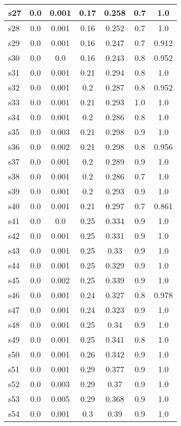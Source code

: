 \documentclass{article}
\begin{document}
\begin{tabular}{|l|c|c|c|c|c|c|}
\hline
s27 &0.0 & 0.001 & 0.17 & 0.258 & 0.7 & 1.0\\
\hline
s28 &0.0 & 0.001 & 0.16 & 0.252 & 0.7 & 1.0\\
\hline
s29 &0.0 & 0.001 & 0.16 & 0.247 & 0.7 & 0.912\\
\hline
s30 &0.0 & 0.0 & 0.16 & 0.243 & 0.8 & 0.952\\
\hline
s31 &0.0 & 0.001 & 0.21 & 0.294 & 0.8 & 1.0\\
\hline
s32 &0.0 & 0.001 & 0.2 & 0.287 & 0.8 & 0.952\\
\hline
s33 &0.0 & 0.001 & 0.21 & 0.293 & 1.0 & 1.0\\
\hline
s34 &0.0 & 0.001 & 0.2 & 0.286 & 0.8 & 1.0\\
\hline
s35 &0.0 & 0.003 & 0.21 & 0.298 & 0.9 & 1.0\\
\hline
s36 &0.0 & 0.002 & 0.21 & 0.298 & 0.8 & 0.956\\
\hline
s37 &0.0 & 0.001 & 0.2 & 0.289 & 0.9 & 1.0\\
\hline
s38 &0.0 & 0.001 & 0.2 & 0.286 & 0.7 & 1.0\\
\hline
s39 &0.0 & 0.001 & 0.2 & 0.293 & 0.9 & 1.0\\
\hline
s40 &0.0 & 0.001 & 0.21 & 0.297 & 0.7 & 0.861\\
\hline
s41 &0.0 & 0.0 & 0.25 & 0.334 & 0.9 & 1.0\\
\hline
s42 &0.0 & 0.001 & 0.25 & 0.331 & 0.9 & 1.0\\
\hline
s43 &0.0 & 0.001 & 0.25 & 0.33 & 0.9 & 1.0\\
\hline
s44 &0.0 & 0.001 & 0.25 & 0.329 & 0.9 & 1.0\\
\hline
s45 &0.0 & 0.002 & 0.25 & 0.339 & 0.9 & 1.0\\
\hline
s46 &0.0 & 0.001 & 0.24 & 0.327 & 0.8 & 0.978\\
\hline
s47 &0.0 & 0.001 & 0.24 & 0.323 & 0.9 & 1.0\\
\hline
s48 &0.0 & 0.001 & 0.25 & 0.34 & 0.9 & 1.0\\
\hline
s49 &0.0 & 0.001 & 0.25 & 0.341 & 0.8 & 1.0\\
\hline
s50 &0.0 & 0.001 & 0.26 & 0.342 & 0.9 & 1.0\\
\hline
s51 &0.0 & 0.001 & 0.29 & 0.377 & 0.9 & 1.0\\
\hline
s52 &0.0 & 0.003 & 0.29 & 0.37 & 0.9 & 1.0\\
\hline
s53 &0.0 & 0.005 & 0.29 & 0.368 & 0.9 & 1.0\\
\hline
s54 &0.0 & 0.001 & 0.3 & 0.39 & 0.9 & 1.0\\

\end{tabular}
\end{document}
